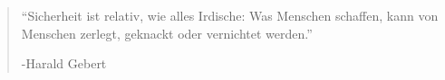 \begin{frame}
	\begin{quote}
		\enquote{Sicherheit ist relativ, wie alles Irdische: Was Menschen schaffen,
		kann von Menschen zerlegt, geknackt oder vernichtet werden.}
		\begin{flushright}
			 \upshape-Harald Gebert\cite{QuoteGebert}
		\end{flushright}
	\end{quote}
\end{frame}